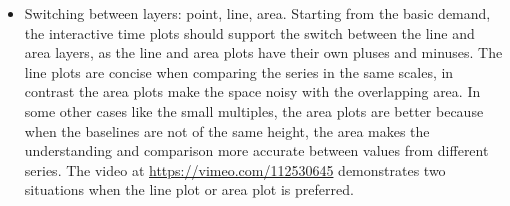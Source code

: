 \documentclass[12pt]{article}
\providecommand{\tabularnewline}{\\}
\begin{document}
\begin{itemize}
\item Switching between layers: point, line, area.
Starting from the basic demand, the interactive time plots should
support the switch between the line and area layers, as the line and
area plots have their own pluses and minuses. The line plots are concise
when comparing the series in the same scales, in contrast the area
plots make the space noisy with the overlapping area. In some other
cases like the small multiples, the area plots are better because
when the baselines are not of the same height, the area makes the
understanding and comparison more accurate between values from
different series. The video at \url{https://vimeo.com/112530645}
demonstrates two situations when the line plot or area plot is
preferred.




\end{itemize}
\end{document}
